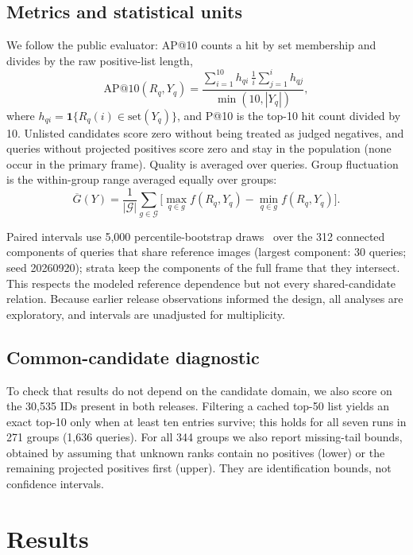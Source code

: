 \documentclass[conference]{IEEEtran}
\begin{document}
\subsection{Metrics and statistical units}
We follow the public evaluator: AP@10 counts a hit by set membership and divides by the raw positive-list length,
\begin{equation}\label{eq:ap}
\mathrm{AP@10}(R_q,Y_q)=\frac{\sum_{i=1}^{10} h_{qi}\,\frac{1}{i}\sum_{j=1}^{i}h_{qj}}{\min(10,|Y_q|)},
\end{equation}
where $h_{qi}=\mathbf 1\{R_q(i)\in\mathrm{set}(Y_q)\}$, and P@10 is the top-10 hit count divided by 10. Unlisted candidates score zero without being treated as judged negatives, and queries without projected positives score zero and stay in the population (none occur in the primary frame). Quality is averaged over queries. Group fluctuation is the within-group range averaged equally over groups:
\begin{equation}\label{eq:range}
\overline G(Y)=\frac{1}{|\mathcal G|}\sum_{g\in\mathcal G}\Big[\max_{q\in g}f(R_q,Y_q)-\min_{q\in g}f(R_q,Y_q)\Big].
\end{equation}

Paired intervals use 5,000 percentile-bootstrap draws~\cite{efron1993} over the 312 connected components of queries that share reference images (largest component: 30 queries; seed 20260920); strata keep the components of the full frame that they intersect. This respects the modeled reference dependence but not every shared-candidate relation. Because earlier release observations informed the design, all analyses are exploratory, and intervals are unadjusted for multiplicity.

\subsection{Common-candidate diagnostic}
To check that results do not depend on the candidate domain, we also score on the 30,535 IDs present in both releases. Filtering a cached top-50 list yields an exact top-10 only when at least ten entries survive; this holds for all seven runs in 271 groups (1,636 queries). For all 344 groups we also report missing-tail bounds, obtained by assuming that unknown ranks contain no positives (lower) or the remaining projected positives first (upper). They are identification bounds, not confidence intervals.

\section{Results}\label{sec:results}
\end{document}
